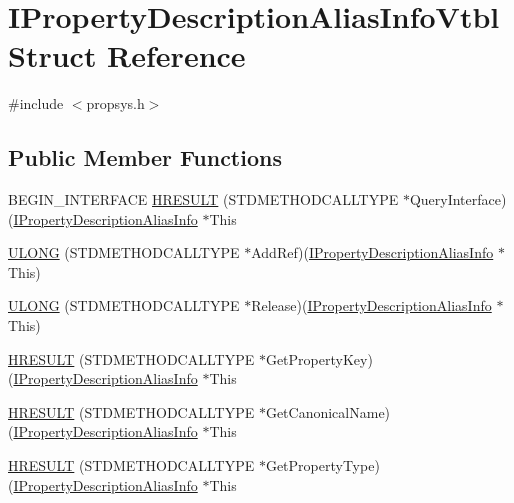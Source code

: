 \hypertarget{struct_i_property_description_alias_info_vtbl}{}\section{I\+Property\+Description\+Alias\+Info\+Vtbl Struct Reference}
\label{struct_i_property_description_alias_info_vtbl}


{\ttfamily \#include $<$propsys.\+h$>$}

\subsection*{Public Member Functions}
\begin{DoxyCompactItemize}
\item 
B\+E\+G\+I\+N\+\_\+\+I\+N\+T\+E\+R\+F\+A\+CE \hyperlink{struct_i_property_description_alias_info_vtbl_a9d3222806ea3983ad5a1574b722783d6}{H\+R\+E\+S\+U\+LT} (S\+T\+D\+M\+E\+T\+H\+O\+D\+C\+A\+L\+L\+T\+Y\+PE $\ast$Query\+Interface)(\hyperlink{propsys_8h_a340fea8f1bc0adf5146e75d71bbdf9bc}{I\+Property\+Description\+Alias\+Info} $\ast$This
\item 
\hyperlink{struct_i_property_description_alias_info_vtbl_ac08160e612b8ab0a0ecde4a669a0044e}{U\+L\+O\+NG} (S\+T\+D\+M\+E\+T\+H\+O\+D\+C\+A\+L\+L\+T\+Y\+PE $\ast$Add\+Ref)(\hyperlink{propsys_8h_a340fea8f1bc0adf5146e75d71bbdf9bc}{I\+Property\+Description\+Alias\+Info} $\ast$This)
\item 
\hyperlink{struct_i_property_description_alias_info_vtbl_ad04a1999c6c07ad5f04af1b5938cd09a}{U\+L\+O\+NG} (S\+T\+D\+M\+E\+T\+H\+O\+D\+C\+A\+L\+L\+T\+Y\+PE $\ast$Release)(\hyperlink{propsys_8h_a340fea8f1bc0adf5146e75d71bbdf9bc}{I\+Property\+Description\+Alias\+Info} $\ast$This)
\item 
\hyperlink{struct_i_property_description_alias_info_vtbl_a81c2f86f5b89dc83e07c529a2eb00af3}{H\+R\+E\+S\+U\+LT} (S\+T\+D\+M\+E\+T\+H\+O\+D\+C\+A\+L\+L\+T\+Y\+PE $\ast$Get\+Property\+Key)(\hyperlink{propsys_8h_a340fea8f1bc0adf5146e75d71bbdf9bc}{I\+Property\+Description\+Alias\+Info} $\ast$This
\item 
\hyperlink{struct_i_property_description_alias_info_vtbl_a9df6ed0e78aab6b9780c47840cd75bbe}{H\+R\+E\+S\+U\+LT} (S\+T\+D\+M\+E\+T\+H\+O\+D\+C\+A\+L\+L\+T\+Y\+PE $\ast$Get\+Canonical\+Name)(\hyperlink{propsys_8h_a340fea8f1bc0adf5146e75d71bbdf9bc}{I\+Property\+Description\+Alias\+Info} $\ast$This
\item 
\hyperlink{struct_i_property_description_alias_info_vtbl_aba558ff7353a5887474395cc4e385e40}{H\+R\+E\+S\+U\+LT} (S\+T\+D\+M\+E\+T\+H\+O\+D\+C\+A\+L\+L\+T\+Y\+PE $\ast$Get\+Property\+Type)(\hyperlink{propsys_8h_a340fea8f1bc0adf5146e75d71bbdf9bc}{I\+Property\+Description\+Alias\+Info} $\ast$This

\end{DoxyCompactItemize}
